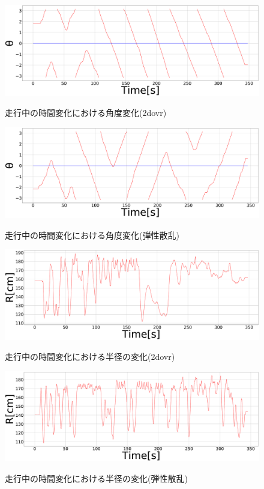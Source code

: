 \documentclass[twocolumn,dvipdfmx]{jarticle}
\begin{document}
\begin{figure}[h]
\begin{center}
  \includegraphics[width=0.85\linewidth]{pic/106_shita.eps}
  \vspace{-3mm}
  \caption{走行中の時間変化における角度変化(2dovr)}
  \label{fig:theta_2dovr}
  \includegraphics[width=0.85\linewidth]{pic/112_shita.eps}
  \vspace{-3mm}
  \caption{走行中の時間変化における角度変化(弾性散乱)}
  \label{fig:theta_ela}
  \includegraphics[width=0.85\linewidth]{pic/106_R.eps}
  \vspace{-3mm}
  \caption{走行中の時間変化における半径の変化(2dovr)}
  \label{fig:R_2dovr}
  \includegraphics[width=0.85\linewidth]{pic/112_R.eps}
  \vspace{-3mm}
  \caption{走行中の時間変化における半径の変化(弾性散乱)}
  \label{fig:R_ela}
\end{center}
\end{figure}
\end{document}
